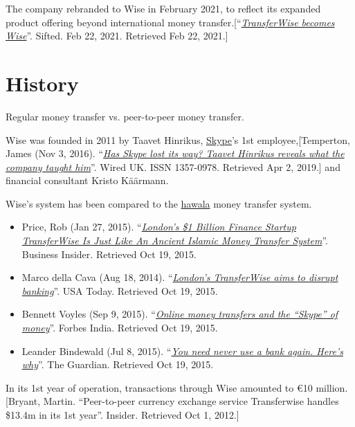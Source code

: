 \documentclass{book}
\numberwithin{equation}{section}
\begin{document}
The company rebranded to Wise in February 2021, to reflect its expanded product offering beyond international money transfer.[``\href{https://sifted.eu/articles/transferwise-becomes-wise/}{\textit{TransferWise becomes Wise}}''. Sifted. Feb 22, 2021. Retrieved Feb 22, 2021.]

\section{History}
\textsf{Regular money transfer vs. peer-to-peer money transfer.}

Wise was founded in 2011 by Taavet Hinrikus, \href{https://en.wikipedia.org/wiki/Skype}{Skype}'s 1st employee,[Temperton, James (Nov 3, 2016). ``\href{https://www.wired.co.uk/article/taavet-hinrikus-transferwise-skype-estonia}{\textit{Has Skype lost its way? Taavet Hinrikus reveals what the company taught him}}''. Wired UK. ISSN 1357-0978. Retrieved Apr 2, 2019.] and financial consultant Kristo Käärmann.

%
Wise's system has been compared to the \href{https://en.wikipedia.org/wiki/Hawala}{hawala} money transfer system.
\begin{itemize}
    \item Price, Rob (Jan 27, 2015). ``\href{http://www.businessinsider.com.au/transferwises-similarities-to-hawala-2015-1}{\textit{London's \$1 Billion Finance Startup TransferWise Is Just Like An Ancient Islamic Money Transfer System}}''. Business Insider. Retrieved Oct 19, 2015.
    \item Marco della Cava (Aug 18, 2014). ``\href{https://www.usatoday.com/story/tech/2014/08/16/transferwise-takes-on-banking-money-transfer-fees/13622337/}{\textit{London's TransferWise aims to disrupt banking}}''. USA Today. Retrieved Oct 19, 2015.
    \item Bennett Voyles (Sep 9, 2015). ``\href{http://forbesindia.com/article/ckgsb/online-money-transfers-and-the-skype-of-money/40999/1}{\textit{Online money transfers and the ``Skype'' of money}}''. Forbes India. Retrieved Oct 19, 2015.
    \item Leander Bindewald (Jul 8, 2015). ``\href{https://www.theguardian.com/sustainable-business/2015/jul/07/banking-sector-credit-unions-local-currency-money}{\textit{You need never use a bank again. Here's why}}''. The Guardian. Retrieved Oct 19, 2015.
\end{itemize}
In its 1st year of operation, transactions through Wise amounted to €10 million.[Bryant, Martin. ``Peer-to-peer currency exchange service Transferwise handles \$13.4m in its 1st year''. Insider. Retrieved Oct 1, 2012.]
\end{document}
